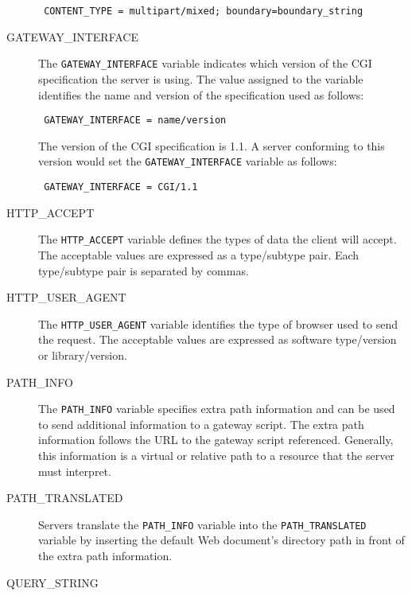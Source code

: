 \begin{description}
{\footnotesize
\begin{verbatim}
 CONTENT_TYPE = multipart/mixed; boundary=boundary_string
\end{verbatim}
}

\item[GATEWAY\_INTERFACE]

The \verb|GATEWAY_INTERFACE| variable indicates which version of the CGI
specification the server is using. The value assigned to the variable identifies
the name and version of the specification used as follows:

\begin{verbatim}
 GATEWAY_INTERFACE = name/version
\end{verbatim}

The version of the CGI specification is 1.1. A server conforming
to this version would set the \verb|GATEWAY_INTERFACE| variable as follows:

\begin{verbatim}
 GATEWAY_INTERFACE = CGI/1.1
\end{verbatim}

\item[HTTP\_ACCEPT]

The \verb|HTTP_ACCEPT| variable defines the types of data the client will
accept. The acceptable values are expressed as a type/subtype pair. Each
type/subtype pair is separated by commas.

\item[HTTP\_USER\_AGENT]

The \verb|HTTP_USER_AGENT| variable identifies the type of browser used to send
the request. The acceptable values are expressed as software type/version
or library/version. 

\item[PATH\_INFO]

The \verb|PATH_INFO| variable specifies extra path information and can be used
to send additional information to a gateway script. The extra path information
follows the URL to the gateway script referenced. Generally, this information
is a virtual or relative path to a resource that the server must interpret. 

\item[PATH\_TRANSLATED]

Servers translate the \verb|PATH_INFO| variable into the {\tt PATH\_TRANSLATED}
variable by inserting the default Web document's directory path in front of the
extra path information. 

\item[QUERY\_STRING]


\end{description}
